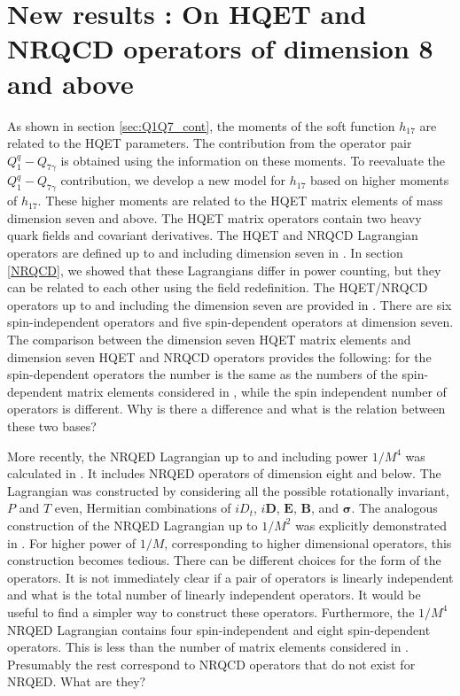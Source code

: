 \chapter{New results : On HQET and NRQCD operators of dimension 8 and above}\label{chap:Matrix_elements}
As shown in section \ref{sec:Q1Q7_cont}, the moments of the soft function $h_{17}$ are related to the HQET parameters. The contribution from the operator pair $Q_{1}^q-Q_{7\gamma}$ is obtained using the information on these moments. To reevaluate the $Q_{1}^q-Q_{7\gamma}$ contribution, we develop a new model for $h_{17}$ based on higher moments of $h_{17}$. These higher moments are related to the HQET matrix elements of mass dimension seven and above. 
The HQET matrix operators contain two heavy quark fields and covariant derivatives. 
The HQET and NRQCD Lagrangian operators are defined up to and including dimension seven in \cite{Manohar:1997qy}. In section \ref{NRQCD}, we showed that these Lagrangians differ in power counting, but they can be related to each other using the field redefinition.  The HQET/NRQCD operators up to and including the dimension seven are provided in \cite{Manohar:1997qy}. There are six spin-independent operators and five spin-dependent operators at dimension seven. The comparison between the dimension seven HQET matrix elements and dimension seven HQET and NRQCD operators provides the following: for the spin-dependent operators the number is the same as the numbers of the spin-dependent matrix elements considered in \cite{Mannel:2010wj}, while the spin independent number of operators is different. Why is there a difference and what is the relation between these two bases? \cite{Gunawardana:2017zix} \par
More recently, the NRQED Lagrangian up to and including power $1/M^4$ was calculated in \cite{Hill:2012rh}. It includes NRQED operators of dimension eight and below.  The Lagrangian was constructed by considering all the possible rotationally invariant, $P$ and $T$ even, Hermitian combinations of $iD_t$, $i\bm{D}$, $\bm{E}$, $\bm{B}$, and $\bm{\sigma}$. The analogous construction of the NRQED Lagrangian up to $1/M^2$ was explicitly demonstrated in \cite{Paz:2015uga}. For higher power of $1/M$, corresponding to higher dimensional operators, this construction becomes  tedious. There can be different choices for the form of the operators. It is not immediately clear if a pair of operators is linearly independent and what is the total number of linearly independent operators.  It would be useful to find a simpler way to construct these operators. Furthermore, the $1/M^4$ NRQED Lagrangian contains four spin-independent and eight spin-dependent operators. This is less than the number of matrix elements considered in \cite{Mannel:2010wj}.  Presumably the rest correspond to NRQCD operators that do not exist for NRQED. What are they? \par

